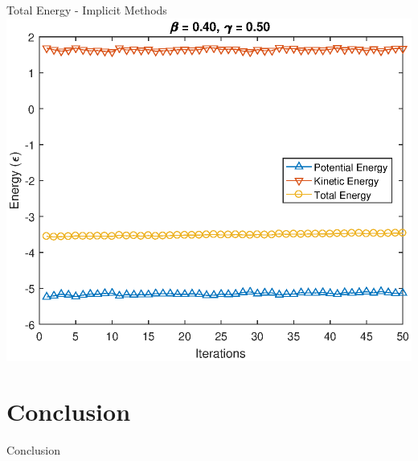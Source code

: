 \documentclass{beamer}
\begin{document}
\begin{frame}{Total Energy - Implicit Methods}
 {
		\centering
		\includegraphics[scale=0.60]{energy_b0,40_g0,50_long.eps}
}
\end{frame}

\section{Conclusion}

\begin{frame}{Conclusion}

\end{frame}
\end{document}
